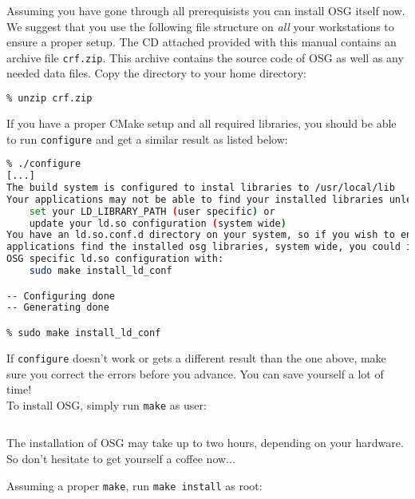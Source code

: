 Assuming you have gone through all prerequisists you can install OSG itself now.
We suggest that you use the following file structure on \textit{all} your workstations to ensure a proper setup. The CD attached provided with this manual contains an archive file \texttt{crf.zip}. This archive contains the source code of OSG as well as any needed data files. Copy the directory to your home directory:

\begin{lstlisting}[language=bash,caption={CRF installation}]
% cp crf.zip ~/
% unzip crf.zip
\end{lstlisting}

If you have a proper CMake setup and all required libraries, you should be able to run \texttt{configure} and get a similar result as listed below:

\begin{lstlisting}[language=bash,caption={OSG configuration}]
% cd ~/crf/OSG-2.8/
% ./configure
[...]
The build system is configured to instal libraries to /usr/local/lib
Your applications may not be able to find your installed libraries unless you:
    set your LD_LIBRARY_PATH (user specific) or
    update your ld.so configuration (system wide)
You have an ld.so.conf.d directory on your system, so if you wish to ensure that
applications find the installed osg libraries, system wide, you could install a
OSG specific ld.so configuration with:
    sudo make install_ld_conf

-- Configuring done
-- Generating done

% sudo make install_ld_conf
\end{lstlisting}

If \texttt{configure} doesn't work or gets a different result than the one above, make sure you correct the errors before you advance. You can save yourself a lot of time! \\

To install OSG, simply run \texttt{make} as user:
\begin{lstlisting}[language=bash,caption={OSG installation}]
% make
\end{lstlisting}

The installation of OSG may take up to two hours, depending on your hardware. So don't hesitate to get yourself a coffee now...

Assuming a proper \texttt{make}, run \texttt{make install} as root:

\begin{lstlisting}[language=bash,caption={Finish OSG installation}]
% sudo make install
\end{lstlisting}

